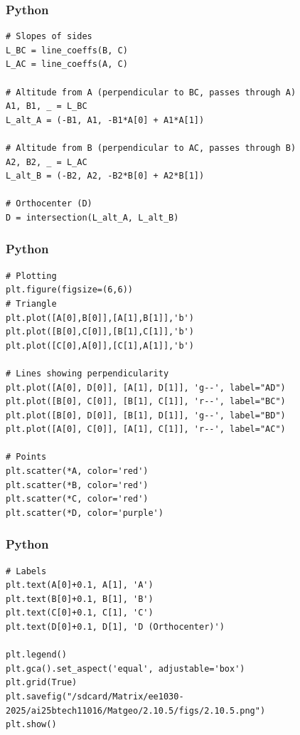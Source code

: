 \documentclass{beamer}
\begin{document}
\begin{frame}[fragile]
    \frametitle{Python}
    \begin{lstlisting}
# Slopes of sides
L_BC = line_coeffs(B, C)
L_AC = line_coeffs(A, C)

# Altitude from A (perpendicular to BC, passes through A)
A1, B1, _ = L_BC
L_alt_A = (-B1, A1, -B1*A[0] + A1*A[1])

# Altitude from B (perpendicular to AC, passes through B)
A2, B2, _ = L_AC
L_alt_B = (-B2, A2, -B2*B[0] + A2*B[1])

# Orthocenter (D)
D = intersection(L_alt_A, L_alt_B)
\end{lstlisting}
 
\end{frame}
\begin{frame}[fragile]
    \frametitle{Python}
    \begin{lstlisting}
# Plotting
plt.figure(figsize=(6,6))
# Triangle
plt.plot([A[0],B[0]],[A[1],B[1]],'b')
plt.plot([B[0],C[0]],[B[1],C[1]],'b')
plt.plot([C[0],A[0]],[C[1],A[1]],'b')

# Lines showing perpendicularity
plt.plot([A[0], D[0]], [A[1], D[1]], 'g--', label="AD")
plt.plot([B[0], C[0]], [B[1], C[1]], 'r--', label="BC")
plt.plot([B[0], D[0]], [B[1], D[1]], 'g--', label="BD")
plt.plot([A[0], C[0]], [A[1], C[1]], 'r--', label="AC")

# Points
plt.scatter(*A, color='red')
plt.scatter(*B, color='red')
plt.scatter(*C, color='red')
plt.scatter(*D, color='purple')
\end{lstlisting}
 
\end{frame}
\begin{frame}[fragile]
    \frametitle{Python}
    \begin{lstlisting}
# Labels
plt.text(A[0]+0.1, A[1], 'A')
plt.text(B[0]+0.1, B[1], 'B')
plt.text(C[0]+0.1, C[1], 'C')
plt.text(D[0]+0.1, D[1], 'D (Orthocenter)')

plt.legend()
plt.gca().set_aspect('equal', adjustable='box')
plt.grid(True)
plt.savefig("/sdcard/Matrix/ee1030-2025/ai25btech11016/Matgeo/2.10.5/figs/2.10.5.png")
plt.show()
\end{lstlisting}
\end{frame}
\end{document}
